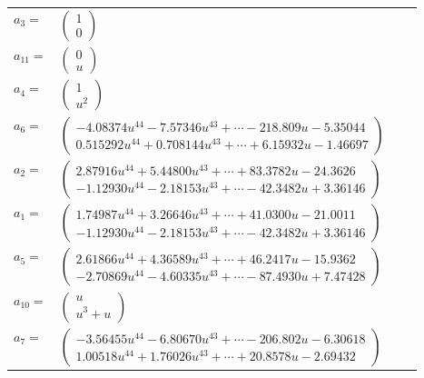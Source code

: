 \documentclass[1p]{elsarticle_modified}
\theoremstyle{definition}
\begin{document}
\begin{tabular}{m{7pt} m{180pt} m{7pt} m{180pt} }
\flushright $a_{3}=$&$\begin{pmatrix}1\\0\end{pmatrix}$ \\
\flushright $a_{11}=$&$\begin{pmatrix}0\\u\end{pmatrix}$ \\
\flushright $a_{4}=$&$\begin{pmatrix}1\\u^2\end{pmatrix}$ \\
\flushright $a_{6}=$&$\begin{pmatrix}-4.08374 u^{44}-7.57346 u^{43}+\cdots-218.809 u-5.35044\\0.515292 u^{44}+0.708144 u^{43}+\cdots+6.15932 u-1.46697\end{pmatrix}$ \\
\flushright $a_{2}=$&$\begin{pmatrix}2.87916 u^{44}+5.44800 u^{43}+\cdots+83.3782 u-24.3626\\-1.12930 u^{44}-2.18153 u^{43}+\cdots-42.3482 u+3.36146\end{pmatrix}$ \\
\flushright $a_{1}=$&$\begin{pmatrix}1.74987 u^{44}+3.26646 u^{43}+\cdots+41.0300 u-21.0011\\-1.12930 u^{44}-2.18153 u^{43}+\cdots-42.3482 u+3.36146\end{pmatrix}$ \\
\flushright $a_{5}=$&$\begin{pmatrix}2.61866 u^{44}+4.36589 u^{43}+\cdots+46.2417 u-15.9362\\-2.70869 u^{44}-4.60335 u^{43}+\cdots-87.4930 u+7.47428\end{pmatrix}$ \\
\flushright $a_{10}=$&$\begin{pmatrix}u\\u^3+u\end{pmatrix}$ \\
\flushright $a_{7}=$&$\begin{pmatrix}-3.56455 u^{44}-6.80670 u^{43}+\cdots-206.802 u-6.30618\\1.00518 u^{44}+1.76026 u^{43}+\cdots+20.8578 u-2.69432\end{pmatrix}$ \\

\end{tabular}
\end{document}
